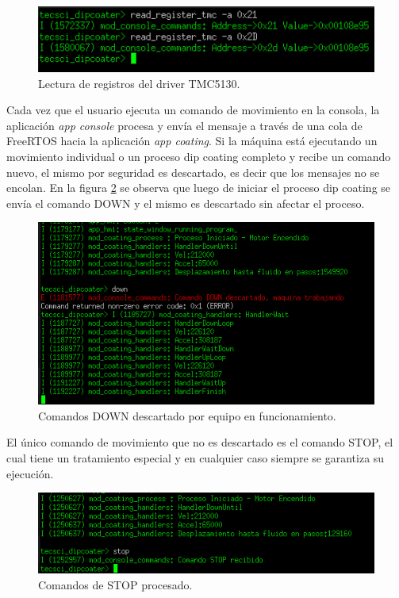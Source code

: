 \begin{figure}[h!]
	\centering
	\includegraphics[width=1\textwidth]{./Figures/consola_6.png}
	\caption{Lectura de registros del driver TMC5130.}
	\label{fig:comando_lectura}
\end{figure}


Cada vez que el usuario ejecuta un comando de movimiento en la consola, la aplicación \textit{app console}  procesa y envía el mensaje a través de una cola de FreeRTOS hacia la aplicación \textit{app coating}. Si la máquina está ejecutando un movimiento individual o un proceso dip coating completo y recibe un comando nuevo, el mismo por seguridad es descartado, es decir que los mensajes no se encolan. En la figura 
\ref{fig:consola_comando_ok} se observa que luego de iniciar el proceso dip coating se envía el comando DOWN y el mismo es descartado sin afectar el proceso.

\begin{figure}[h!]
	\centering
	\includegraphics[width=1\textwidth]{./Figures/consola_4.png}
	\caption{Comandos DOWN descartado por equipo en funcionamiento.}
	\label{fig:consola_comando_ok}
\end{figure}

El único comando de movimiento que no es descartado es el comando STOP, el cual tiene un tratamiento especial y en cualquier caso siempre se garantiza su ejecución.

\begin{figure}[h!]
	\centering
	\includegraphics[width=1\textwidth]{./Figures/consola_5.png}
	\caption{Comandos de STOP procesado.}
	\label{fig:consola_comando_false}
\end{figure}


